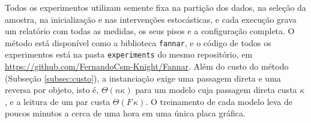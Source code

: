 Todos os experimentos utilizam semente fixa na partição dos dados, na seleção da amostra, na inicialização e nas intervenções estocásticas, e cada execução grava um relatório com todas as medidas, os seus pisos e a configuração completa. O método está disponível como a biblioteca \texttt{fannar}, e o código de todos os experimentos está na pasta \texttt{experiments} do mesmo repositório, em \url{https://github.com/FernandoCsm-Knight/Fannar}. Além do custo do método (Subseção \ref{subsec:custo}), a instanciação exige uma passagem direta e uma reversa por objeto, isto é, $\Theta(n\kappa)$ para um modelo cuja passagem direta custa $\kappa$ \citep{GriewankWalther2008}, e a leitura de um par custa $\Theta(F\,\kappa)$. O treinamento de cada modelo leva de poucos minutos a cerca de uma hora em uma única placa gráfica.
